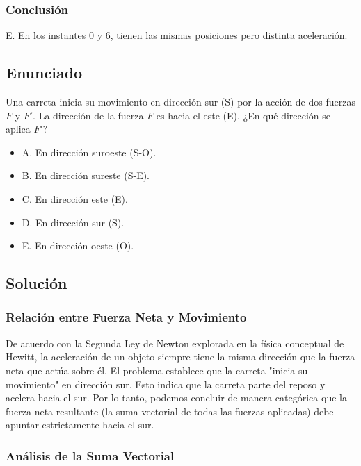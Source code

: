 \documentclass[12pt, a4paper]{article}
\begin{document}
\subsubsection*{Conclusión}

E. En los instantes 0 y 6, tienen las mismas posiciones pero distinta aceleración.

\newpage

\subsection*{Enunciado}
Una carreta inicia su movimiento en dirección sur (S) por la acción de dos fuerzas $F$ y $F'$. La dirección de la fuerza $F$ es hacia el este (E). ¿En qué dirección se aplica $F'$?

\begin{itemize}
    \item A. En dirección suroeste (S-O).
    \item B. En dirección sureste (S-E).
    \item C. En dirección este (E).
    \item D. En dirección sur (S).
    \item E. En dirección oeste (O).
\end{itemize}

\subsection*{Solución}

\subsubsection*{Relación entre Fuerza Neta y Movimiento}

De acuerdo con la Segunda Ley de Newton explorada en la física conceptual de Hewitt, la aceleración de un objeto siempre tiene la misma dirección que la fuerza neta que actúa sobre él. El problema establece que la carreta "inicia su movimiento" en dirección sur. Esto indica que la carreta parte del reposo y acelera hacia el sur. Por lo tanto, podemos concluir de manera categórica que la fuerza neta resultante (la suma vectorial de todas las fuerzas aplicadas) debe apuntar estrictamente hacia el sur.

\subsubsection*{Análisis de la Suma Vectorial}
\end{document}
